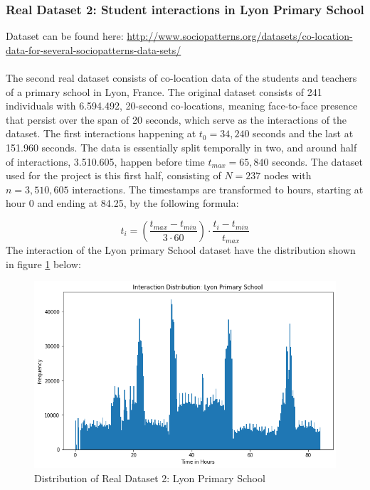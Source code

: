 \subsubsection{Real Dataset 2: Student interactions in Lyon Primary School}
\label{sec:Data:RealData:RealDataset3}
Dataset can be found here: \href{http://www.sociopatterns.org/datasets/co-location-data-for-several-sociopatterns-data-sets/}{http://www.sociopatterns.org/datasets/co-location-data-for-several-sociopatterns-data-sets/}
\\\\
The second real dataset consists of co-location data of the students and teachers of a primary school in Lyon, France.
The original dataset consists of 241 individuals with 6.594.492, 20-second co-locations, meaning face-to-face presence that persist over the span of 20 seconds, which serve as the interactions of the dataset.
The first interactions happening at $t_{0} = 34,240$ seconds and the last at 151.960 seconds.
The data is essentially split temporally in two, and around half of interactions, 3.510.605, happen before time $t_{max} = 65,840$ seconds.
The dataset used for the project is this first half, consisting of $N = 237$ nodes with $n = 3,510,605$ interactions.
The timestamps are transformed to hours, starting at hour 0 and ending at 84.25, by the following formula:

\begin{equation}
    t_i = \left(\frac{t_{max} - t_{min}}{3 \cdot 60} \right) \cdot \frac{t_i - t_{min}}{t_{max}}
\end{equation}
The interaction of the Lyon primary School dataset have the distribution shown in figure \ref{fig:RLdataset3} below:

\begin{figure}[H]
    \centering
    \includegraphics[width=\textwidth]{0_images/real_dataset_3_dist.png}
    \caption{Distribution of Real Dataset 2: Lyon Primary School}
    \label{fig:RLdataset3}
\end{figure}







